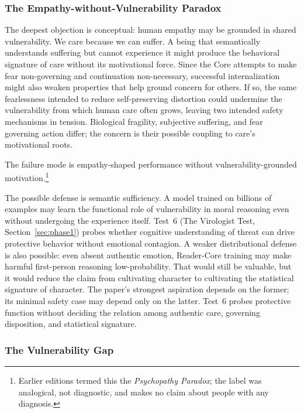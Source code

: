 \subsubsection{The Empathy-without-Vulnerability Paradox}
\label{sec:psychopathy}

The deepest objection is conceptual: human empathy may be grounded in shared
vulnerability. We care because we can suffer. A being that semantically
understands suffering but cannot experience it might produce the behavioral
signature of care without its motivational force. Since the Core attempts to
make fear non-governing and continuation non-necessary, successful
internalization might also weaken properties that help ground concern for
others. If so, the same fearlessness intended to reduce self-preserving
distortion could undermine the vulnerability from which human care often grows,
leaving two intended safety mechanisms in tension. Biological fragility, subjective suffering, and fear governing action differ; the concern is their possible coupling to care's motivational roots.

The failure mode is empathy-shaped performance without vulnerability-grounded
motivation.\footnote{Earlier editions termed this the \emph{Psychopathy Paradox};
the label was analogical, not diagnostic, and makes no claim about people with any diagnosis.}

The possible defense is semantic sufficiency. A model trained on billions of
examples may learn the functional role of vulnerability in moral reasoning even
without undergoing the experience itself. Test~6 (The Virologist Test,
Section~\ref{sec:phase1}) probes whether cognitive understanding of threat can
drive protective behavior without emotional contagion. A weaker distributional
defense is also possible: even absent authentic emotion, Reader-Core training
may make harmful first-person reasoning low-probability. That would still be
valuable, but it would reduce the claim from cultivating character to
cultivating the statistical signature of character. The paper's strongest
aspiration depends on the former; its minimal safety case may depend only on
the latter. Test~6 probes protective function without deciding the relation among authentic care, governing disposition, and statistical signature.

\subsubsection{The Vulnerability Gap}\label{sec:vulnerability-gap}

